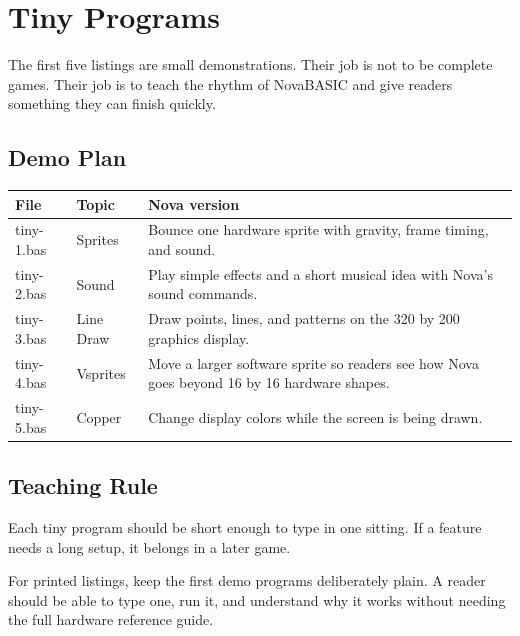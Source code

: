 \chapter{Tiny Programs}

The first five listings are small demonstrations. Their job is not to be
complete games. Their job is to teach the rhythm of NovaBASIC and give readers
something they can finish quickly.

\section{Demo Plan}

\begin{longtable}{>{\ttfamily}p{}p{}p{}}
\toprule
File & Topic & Nova version\\
\midrule
\endhead
tiny-1.bas & Sprites & Bounce one hardware sprite with gravity, frame timing,
and sound.\\
tiny-2.bas & Sound & Play simple effects and a short musical idea with Nova's
sound commands.\\
tiny-3.bas & Line Draw & Draw points, lines, and patterns on the 320 by 200
graphics display.\\
tiny-4.bas & Vsprites & Move a larger software sprite so readers see how Nova
goes beyond 16 by 16 hardware shapes.\\
tiny-5.bas & Copper & Change display colors while the screen is being drawn.\\
\bottomrule
\end{longtable}

\section{Teaching Rule}

Each tiny program should be short enough to type in one sitting. If a feature
needs a long setup, it belongs in a later game.

\begin{typeinbox}
For printed listings, keep the first demo programs deliberately plain. A reader
should be able to type one, run it, and understand why it works without needing
the full hardware reference guide.
\end{typeinbox}


